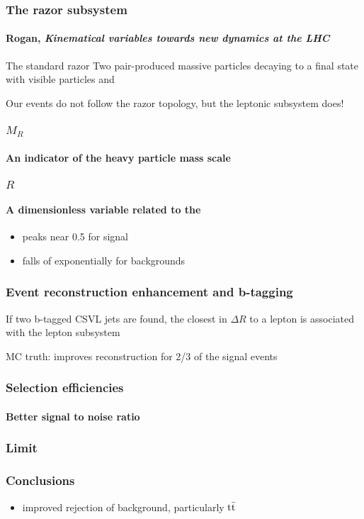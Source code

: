 \documentclass[ukenglish]{beamer}
\begin{document}
\begin{frame}
    \frametitle{The razor subsystem}
    \framesubtitle{Rogan, \emph{Kinematical variables towards new dynamics
    at the LHC}}
    \begin{block}{The standard razor}
        Two pair-produced massive particles decaying to a final state with
        visible particles and \met
    \end{block}
    \alert{Our events do not follow the razor topology, but the leptonic
    subsystem does!}
\end{frame}

\begin{frame}
    \frametitle{$M_R$}
    \framesubtitle{An indicator of the heavy particle mass scale}
\end{frame}

\begin{frame}
    \frametitle{$R$}
    \framesubtitle{A dimensionless variable related to the \met}
    \begin{itemize}
        \item peaks near 0.5 for signal
        \item falls of exponentially for backgrounds
    \end{itemize}
\end{frame}

\begin{frame}
    \frametitle{Event reconstruction enhancement and b-tagging}

    \alert{If two b-tagged CSVL jets are found, the closest in $\Delta R$ to
    a lepton is associated with the lepton subsystem}

    \alert{MC truth: improves reconstruction for 2/3 of the signal events}
\end{frame}

\begin{frame}
    \frametitle{Selection efficiencies}
    \framesubtitle{Better signal to noise ratio}
\end{frame}

\begin{frame}
    \frametitle{Limit}
\end{frame}

\begin{frame}
    \frametitle{Conclusions}
    \begin{itemize}
        \item improved rejection of background, particularly $\mathrm{t}\bar{\mathrm{t}}$
    \end{itemize}
\end{frame}
\end{document}
